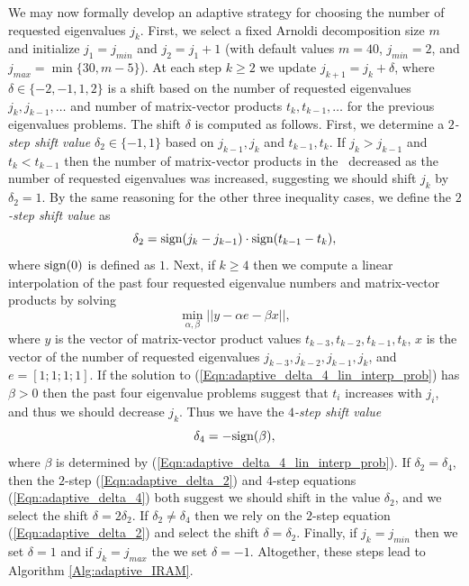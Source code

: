 We may now formally develop an adaptive strategy for choosing the number of requested eigenvalues $j_k$.
First, we select a fixed Arnoldi decomposition size $m$ and initialize $j_1=j_{min}$ and $j_2 = j_1+1$ (with default values $m=40$, $j_{min}=2$, and $j_{max} = \min\{ 30, m-5 \}$).  
At each step $k \geq 2$ we update $j_{k+1} =  j_k + \delta$, where $\delta \in \{-2, -1, 1, 2\}$ is a shift based on the number of requested eigenvalues $j_k, j_{k-1}, \ldots$ and number of matrix-vector products $t_k, t_{k-1}, \ldots$ for the previous eigenvalues problems.
The shift $\delta$ is computed as follows.
First, we determine a \textit{$2$-step shift value} $\delta_2 \in \{-1, 1\}$ based on $j_{k-1}, j_k$ and $t_{k-1}, t_k$.
If $j_k > j_{k-1}$ and $t_k < t_{k-1}$ then the number of matrix-vector products in the \emep \ decreased as the number of requested eigenvalues was increased, suggesting we should shift $j_k$ by $\delta_2 = 1$.
By the same reasoning for the other three inequality cases, we define the
\textit{$2$-step shift value} as
\begin{equation}				\label{Eqn:adaptive_delta_2}
\delta_2 = \textnormal{sign}(j_k - j_{k-1}) \cdot \textnormal{sign}(t_{k-1} - t_k),
\end{equation}
where $\textnormal{sign}(0)$ is defined as $1$.
Next, if $k \geq 4$ then we compute a linear interpolation of the past four requested eigenvalue numbers and matrix-vector products by solving
\begin{equation} 			\label{Eqn:adaptive_delta_4_lin_interp_prob}
\min_{\alpha, \beta} || y - \alpha e - \beta x ||,
\end{equation}
where $y$ is the vector of matrix-vector product values $t_{k-3}, t_{k-2}, t_{k-1}, t_k$, $x$ is the vector of the number of requested eigenvalues $j_{k-3}, j_{k-2}, j_{k-1}, j_k$, and $e = [1;1;1;1]$.
If the solution to (\ref{Eqn:adaptive_delta_4_lin_interp_prob}) has $\beta > 0$ then the past four eigenvalue problems suggest that $t_i$ increases with $j_i$, and thus we should decrease $j_k$.
Thus we have the \textit{$4$-step shift value}
\begin{equation}			\label{Eqn:adaptive_delta_4}
\delta_4 = -\textnormal{sign}(\beta),
\end{equation}
where $\beta$ is determined by (\ref{Eqn:adaptive_delta_4_lin_interp_prob}).
If $\delta_2 = \delta_4$, then the $2$-step (\ref{Eqn:adaptive_delta_2}) and $4$-step equations (\ref{Eqn:adaptive_delta_4}) both suggest we should shift in the value $\delta_2$, and we select the shift $\delta = 2\delta_2$.
If $\delta_2 \neq \delta_4$ then we rely on the $2$-step equation (\ref{Eqn:adaptive_delta_2}) and select the shift $\delta = \delta_2$.
Finally, if $j_k = j_{min}$ then we set $\delta = 1$ and if $j_k = j_{max}$ the we set $\delta = -1$.
Altogether, these steps lead to Algorithm \ref{Alg:adaptive_IRAM}.




